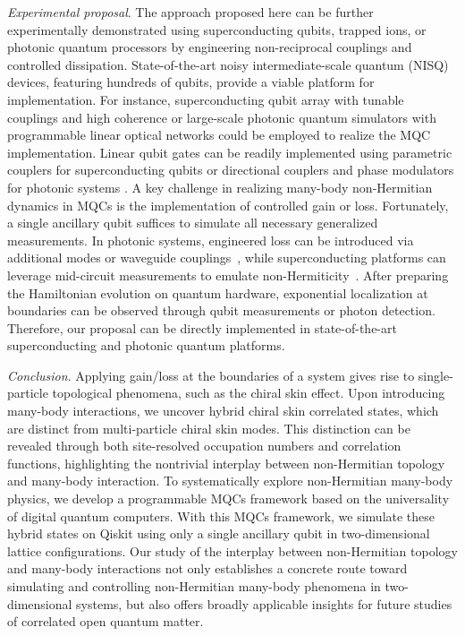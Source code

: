 \documentclass[longbibliography, aps, prx, amsmath, amssymb, amsfonts, twocolumn,superscriptaddress, footinbib]{revtex4-1}
\begin{document}
	\textit{Experimental proposal}. The approach proposed here can be further experimentally demonstrated using superconducting qubits, trapped ions, or photonic quantum processors by engineering non-reciprocal couplings and controlled dissipation. State-of-the-art noisy intermediate-scale quantum (NISQ) devices, featuring hundreds of qubits, provide a viable platform for implementation. For instance, superconducting qubit array with tunable couplings and high coherence \cite{guo2021observation, preskill2018quantum, wu2021strong} or large-scale photonic quantum simulators with programmable linear optical networks \cite{zhong2020quantum, madsen2022quantum, zhu2024dynamically} could be employed to realize the MQC implementation. Linear qubit gates can be readily implemented using parametric couplers for superconducting qubits or directional couplers and phase modulators for photonic systems \cite{zhu2024large}. A key challenge in realizing many-body non-Hermitian dynamics in MQCs is the implementation of controlled gain or loss. Fortunately, a single ancillary qubit suffices to simulate all necessary generalized measurements. In photonic systems, engineered loss can be introduced via additional modes or waveguide couplings~\cite{hoch2025quantum, carolan2020variational}, while superconducting platforms can leverage mid-circuit measurements to emulate non-Hermiticity~\cite{shen2024enhanced,shen2025observation}. After preparing the Hamiltonian evolution on quantum hardware, exponential localization at boundaries can be observed through qubit measurements or photon detection. Therefore, our proposal can be directly implemented in state-of-the-art superconducting and photonic quantum platforms. 

	\textit{Conclusion}. Applying gain/loss at the boundaries of a system gives rise to single-particle topological phenomena, such as the chiral skin effect. Upon introducing many-body interactions, we uncover hybrid chiral skin correlated states, which are distinct from multi-particle chiral skin modes. This distinction can be revealed through both site-resolved occupation numbers and correlation functions, highlighting the nontrivial interplay between non-Hermitian topology and many-body interaction. 
	To systematically explore non-Hermitian many-body physics, we develop a programmable MQCs framework based on the universality of digital quantum computers. 
	With this MQCs framework, we simulate these hybrid states on Qiskit using only a single ancillary qubit in two-dimensional lattice configurations. 
	Our study of the interplay between non-Hermitian topology and many-body interactions not only establishes a concrete route toward simulating and controlling non-Hermitian many-body phenomena in two-dimensional systems, but also offers broadly applicable insights for future studies of correlated open quantum matter.
\end{document}
